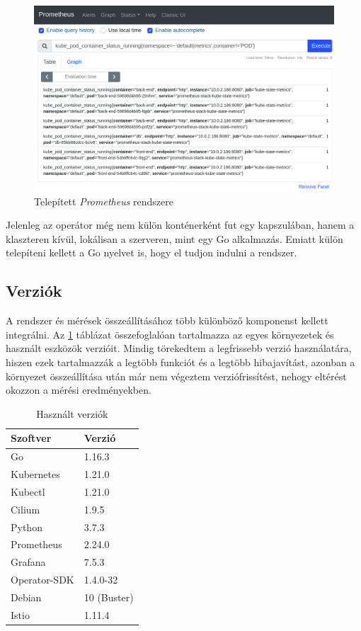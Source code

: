 \begin{figure}[!ht]
\centering
\includegraphics[width=150mm, keepaspectratio]{figures/prometheus_example.png}
\caption{Telepített \textit{Prometheus} rendszere}
\label{fig:prometheus_example}
\end{figure}

Jelenleg az operátor még nem külön konténerként fut egy kapszulában, hanem a klaszteren kívül, lokálisan a szerveren, mint egy Go alkalmazás.
Emiatt külön telepíteni kellett a Go nyelvet is, hogy el tudjon indulni a rendszer.

\subsection{Verziók}
A rendszer és mérések összeállításához több különböző komponenst kellett integrálni.
Az \ref{tab:versions} táblázat összefoglalóan tartalmazza az egyes környezetek és használt eszközök verzióit. 
Mindig törekedtem a legfrissebb verzió használatára, hiszen ezek tartalmazzák a legtöbb funkciót és a legtöbb hibajavítást, azonban a környezet összeállítása után már nem végeztem verziófrissítést, nehogy eltérést okozzon a mérési eredményekben.

\begin{table}[ht]
\centering
  \begin{tabular}{l l}
	  Szoftver 		& Verzió \\
    \hline
      Go 			& 1.16.3 \\ 
      Kubernetes 	& 1.21.0 \\ 
      Kubectl 		& 1.21.0 \\
      Cilium 		& 1.9.5 \\
      Python 		& 3.7.3 \\ 
      Prometheus 	& 2.24.0 \\ 
      Grafana 		& 7.5.3 \\ 
      Operator-SDK 	& 1.4.0-32 \\ 
      Debian 		& 10 (Buster)  \\ 
      Istio			& 1.11.4 \\
  \end{tabular}
  
  \caption{Használt verziók}
\label{tab:versions}
\end{table}


